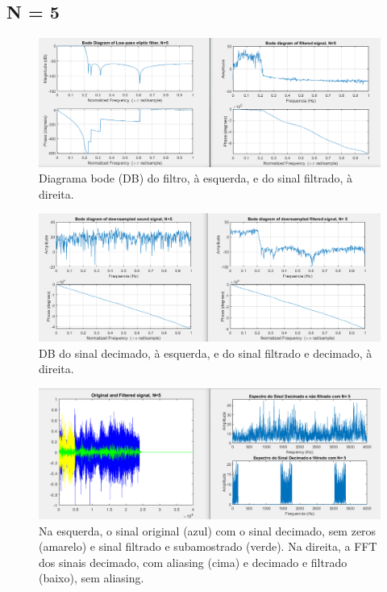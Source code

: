 \documentclass{article}
\begin{document}
\subsection{N = 5}
\vfill
\begin{figure}[h!]
\centering
\includegraphics[scale=0.5]{matlab_test_images/cut_images/fil11.PNG}
\caption{Diagrama bode (DB) do filtro, à esquerda, e do sinal filtrado, à direita.}
\label{fig:matlab_test_images/cut_images/fil11}
\end{figure}
\begin{figure}[h!]
\centering
\includegraphics[scale=0.5]{matlab_test_images/cut_images/fil12.PNG}
\caption{DB do sinal decimado, à esquerda, e do sinal filtrado e decimado, à direita.}
\label{fig:matlab_test_images/cut_images/fil12}
\end{figure}  
\newpage
\begin{figure}[h!]
\centering
\includegraphics[scale=0.5]{matlab_test_images/cut_images/fil13.PNG}
\caption{Na esquerda, o sinal original (azul) com o sinal decimado, sem zeros (amarelo) e sinal filtrado e subamostrado (verde). Na direita, a FFT dos sinais decimado, com aliasing (cima) e decimado e filtrado (baixo), sem aliasing.}
\label{fig:matlab_test_images/cut_images/fil13}
\end{figure}  
\end{document}
